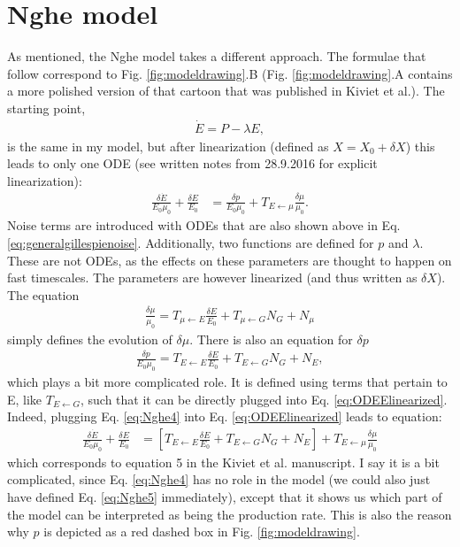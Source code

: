 \section{Nghe model}

As mentioned, the Nghe model takes a different approach. 
The formulae that follow correspond to Fig. \ref{fig:modeldrawing}.B (Fig. \ref{fig:modeldrawing}.A contains a more polished version of that cartoon that was published in Kiviet et al.).
The starting point,
%
\begin{align}
\label{eq:Nghe1}
\dot{E} = P - \lambda E
,
\end{align}
%
is the same in my model, but after linearization (defined as $X=X_0+\delta X$) this leads to only one ODE (see written notes from 28.9.2016 for explicit linearization):
%
\begin{align}
\label{eq:ODEElinearized}
\frac{ \delta{\dot{E}} }{E_0 \mu_0} 
+ \frac{\delta E}{E_0} 
& =
\frac{\delta p}{E_0 \mu_0} + T_{E \leftarrow \mu} \frac{\delta \mu}{\mu_0}
.
\end{align}
%
Noise terms are introduced with ODEs that are also shown above in Eq. \ref{eq:generalgillespienoise}.
 Additionally, two functions are defined for $p$ and $\lambda$. These are not ODEs, as the effects on these parameters are thought to happen on fast timescales. The parameters are however linearized (and thus written as $\delta X$). The equation
%
\begin{align}
\label{eq:Nghe3}
\frac{\delta\mu}{\mu_0} = T_{\mu \leftarrow E} \frac{\delta E}{E_0} + T_{\mu \leftarrow G} N_G + N_\mu
\end{align}
%
simply defines the evolution of $\delta \mu$.
There is also an equation for $\delta p$
%
\begin{align}
\label{eq:Nghe4}
\frac{\delta{p}}{E_0 \mu_0} = T_{E \leftarrow E} \frac{\delta E}{E_0} + T_{E \leftarrow G} N_G + N_E
,
\end{align}
%
which plays a bit more complicated role.
It is defined using terms that pertain to E, like $T_{E \leftarrow G}$, such that it can be directly plugged into Eq. \ref{eq:ODEElinearized}. 
Indeed, plugging Eq. \ref{eq:Nghe4} into Eq. \ref{eq:ODEElinearized} leads to equation:
%
\begin{align}
\label{eq:Nghe5}
\frac{ \delta{\dot{E}} }{E_0 \mu_0} 
+ \frac{\delta E}{E_0} 
& = 
\left[
 T_{E \leftarrow E} \frac{\delta E}{E_0} + T_{E \leftarrow G} N_G + N_E 
 \right]
 + T_{E \leftarrow \mu} \frac{\delta \mu}{\mu_0} 
\end{align}
%
which corresponds to equation 5 in the Kiviet et al. \cite{Kiviet2014} manuscript.
I say it is a bit complicated, since Eq. \ref{eq:Nghe4} has no role in the model (we could also just have defined Eq. \ref{eq:Nghe5} immediately), except that it shows us which part of the model can be interpreted as being the production rate.
This is also the reason why $p$ is depicted as a red dashed box in Fig. \ref{fig:modeldrawing}.

